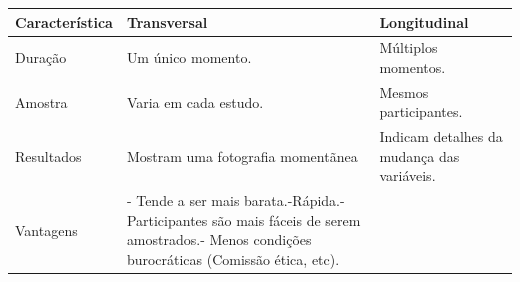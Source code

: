 \documentclass[
]{book}
\begin{document}
\begin{longtable}[]{@{}lll@{}}
\toprule
\begin{minipage}[b]{0.31\columnwidth}\raggedright
Característica\strut
\end{minipage} & \begin{minipage}[b]{0.29\columnwidth}\raggedright
Transversal\strut
\end{minipage} & \begin{minipage}[b]{0.31\columnwidth}\raggedright
Longitudinal\strut
\end{minipage}\tabularnewline
\midrule
\endhead
\begin{minipage}[t]{0.31\columnwidth}\raggedright
Duração\strut
\end{minipage} & \begin{minipage}[t]{0.29\columnwidth}\raggedright
Um único momento.\strut
\end{minipage} & \begin{minipage}[t]{0.31\columnwidth}\raggedright
Múltiplos momentos.\strut
\end{minipage}\tabularnewline
\begin{minipage}[t]{0.31\columnwidth}\raggedright
Amostra\strut
\end{minipage} & \begin{minipage}[t]{0.29\columnwidth}\raggedright
Varia em cada estudo.\strut
\end{minipage} & \begin{minipage}[t]{0.31\columnwidth}\raggedright
Mesmos participantes.\strut
\end{minipage}\tabularnewline
\begin{minipage}[t]{0.31\columnwidth}\raggedright
Resultados\strut
\end{minipage} & \begin{minipage}[t]{0.29\columnwidth}\raggedright
Mostram uma fotografia momentãnea\strut
\end{minipage} & \begin{minipage}[t]{0.31\columnwidth}\raggedright
Indicam detalhes da mudança das variáveis.\strut
\end{minipage}\tabularnewline
\begin{minipage}[t]{0.31\columnwidth}\raggedright
Vantagens\strut
\end{minipage} & \begin{minipage}[t]{0.29\columnwidth}\raggedright
- Tende a ser mais barata.-Rápida.-Participantes são mais fáceis de serem amostrados.- Menos condições burocráticas (Comissão ética, etc).\strut

\end{minipage}
\end{longtable}
\end{document}
